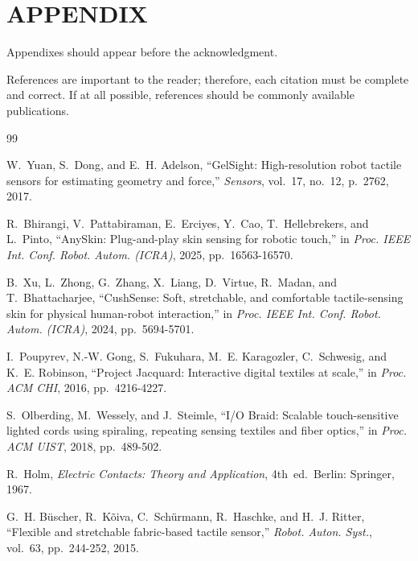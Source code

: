 \documentclass[letterpaper, 10 pt, conference]{ieeeconf}  %
\begin{document}
\section*{APPENDIX}

Appendixes should appear before the acknowledgment.






References are important to the reader; therefore, each citation must be complete and correct. If at all possible, references should be commonly available publications.



\begin{thebibliography}{99}

W.~Yuan, S.~Dong, and E.~H. Adelson,
``GelSight: High-resolution robot tactile sensors for estimating geometry and force,''
\emph{Sensors}, vol.~17, no.~12, p.~2762, 2017.

R.~Bhirangi, V.~Pattabiraman, E.~Erciyes, Y.~Cao, T.~Hellebrekers, and L.~Pinto,
``AnySkin: Plug-and-play skin sensing for robotic touch,''
in \emph{Proc. IEEE Int. Conf. Robot. Autom. (ICRA)}, 2025, pp.~16563-16570.

B.~Xu, L.~Zhong, G.~Zhang, X.~Liang, D.~Virtue, R.~Madan, and T.~Bhattacharjee,
``CushSense: Soft, stretchable, and comfortable tactile-sensing skin for
physical human-robot interaction,''
in \emph{Proc. IEEE Int. Conf. Robot. Autom. (ICRA)}, 2024, pp.~5694-5701.

I.~Poupyrev, N.-W. Gong, S.~Fukuhara, M.~E. Karagozler, C.~Schwesig, and K.~E. Robinson,
``Project Jacquard: Interactive digital textiles at scale,''
in \emph{Proc. ACM CHI}, 2016, pp.~4216-4227.

S.~Olberding, M.~Wessely, and J.~Steimle,
``I/O Braid: Scalable touch-sensitive lighted cords using spiraling, repeating
sensing textiles and fiber optics,''
in \emph{Proc. ACM UIST}, 2018, pp.~489-502.

R.~Holm,
\emph{Electric Contacts: Theory and Application}, 4th~ed.\ Berlin: Springer, 1967.

G.~H. B\"uscher, R.~K\~oiva, C.~Sch\"urmann, R.~Haschke, and H.~J. Ritter,
``Flexible and stretchable fabric-based tactile sensor,''
\emph{Robot. Auton. Syst.}, vol.~63, pp.~244-252, 2015.


\end{thebibliography}
\end{document}
